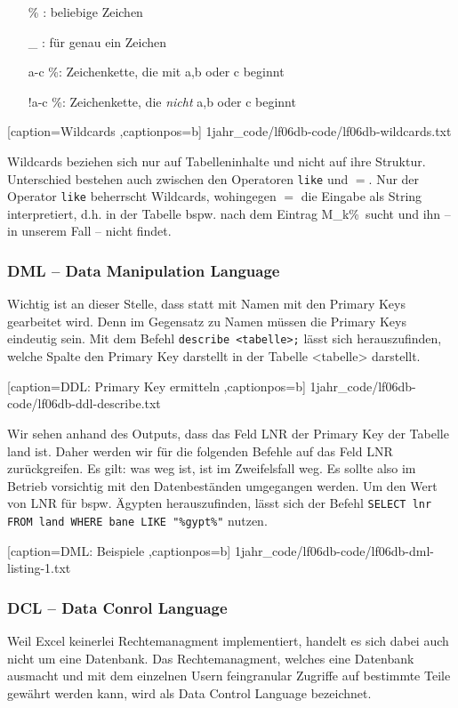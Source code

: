 \begin{itemize}
	\item [\%]: beliebige Zeichen
	\item [\_]: für genau ein Zeichen
	\item [a-c]\%: Zeichenkette, die mit a,b oder c beginnt  
	\item [!a-c]\%: Zeichenkette, die \emph{nicht} a,b oder c beginnt
\end{itemize}


	[caption={Wildcards}
	\label{lst:wildcards},captionpos=b]
	{1jahr_code/lf06db-code/lf06db-wildcards.txt}

Wildcards beziehen sich nur auf Tabelleninhalte und nicht auf ihre Struktur. Unterschied bestehen auch zwischen den Operatoren \texttt{like} und $=$. Nur der Operator \texttt{like} beherrscht Wildcards, wohingegen $=$ die Eingabe als String interpretiert, d.h. in der Tabelle bspw. nach dem Eintrag \ql M\_k\%\qr\ sucht und ihn -- in unserem Fall -- nicht findet.

\subsubsection{DML -- Data Manipulation Language}

Wichtig ist an dieser Stelle, dass statt mit Namen mit den Primary Keys gearbeitet wird. Denn im Gegensatz zu Namen müssen die Primary Keys eindeutig sein. Mit dem Befehl \texttt{describe <tabelle>;} lässt sich herauszufinden, welche Spalte den Primary Key darstellt in der Tabelle <tabelle> darstellt.


	[caption={DDL: Primary Key ermitteln}
	\label{lst:ddl-describe},captionpos=b]
	{1jahr_code/lf06db-code/lf06db-ddl-describe.txt}

Wir sehen anhand des Outputs, dass das Feld LNR der Primary Key der Tabelle land ist. Daher werden wir für die folgenden Befehle auf das Feld LNR zurückgreifen. Es gilt: was weg ist, ist im Zweifelsfall weg. Es sollte also im Betrieb vorsichtig mit den Datenbeständen umgegangen werden. Um den Wert von LNR für bspw. Ägypten herauszufinden, lässt sich der Befehl \verb+SELECT lnr FROM land WHERE bane LIKE "%gypt%"+ nutzen.	


	[caption={DML: Beispiele}
	\label{lst:dml-listing-1},captionpos=b]
	{1jahr_code/lf06db-code/lf06db-dml-listing-1.txt}

\subsubsection{DCL -- Data Conrol Language}
Weil Excel keinerlei Rechtemanagment implementiert, handelt es sich dabei auch nicht um eine Datenbank. Das Rechtemanagment, welches eine Datenbank ausmacht und mit dem einzelnen Usern feingranular Zugriffe auf bestimmte Teile gewährt werden kann, wird als Data Control Language bezeichnet.

